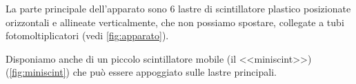 La parte principale dell'apparato sono 6 lastre di scintillatore plastico
posizionate orizzontali e allineate verticalmente,
che non possiamo spostare,
collegate a tubi fotomoltiplicatori (vedi \autoref{fig:apparato}).

Disponiamo anche di un piccolo scintillatore mobile (il <<miniscint>>) (\autoref{fig:miniscint})
che può essere appoggiato sulle lastre principali.
